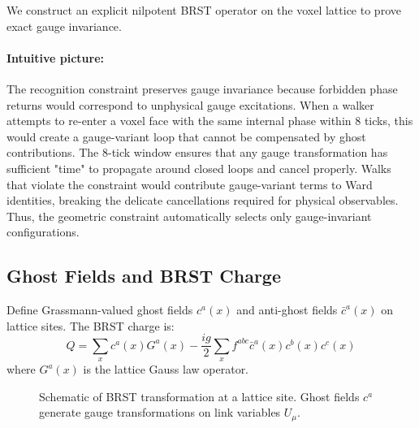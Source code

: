 \documentclass[11pt,a4paper]{article}
\theoremstyle{definition}
\theoremstyle{remark}
\begin{document}
We construct an explicit nilpotent BRST operator on the voxel lattice to prove exact gauge invariance.

\paragraph{Intuitive picture:} The recognition constraint preserves gauge invariance because forbidden phase returns would correspond to unphysical gauge excitations. When a walker attempts to re-enter a voxel face with the same internal phase within 8 ticks, this would create a gauge-variant loop that cannot be compensated by ghost contributions. The 8-tick window ensures that any gauge transformation has sufficient "time" to propagate around closed loops and cancel properly. Walks that violate the constraint would contribute gauge-variant terms to Ward identities, breaking the delicate cancellations required for physical observables. Thus, the geometric constraint automatically selects only gauge-invariant configurations.

\subsection{Ghost Fields and BRST Charge}

Define Grassmann-valued ghost fields $c^a(x)$ and anti-ghost fields $\bar{c}^a(x)$ on lattice sites. The BRST charge is:
\[
Q = \sum_x c^a(x) G^a(x) - \frac{ig}{2} \sum_x f^{abc} \bar{c}^a(x) c^b(x) c^c(x)
\]
where $G^a(x)$ is the lattice Gauss law operator.

\begin{figure}[ht]
\centering
{}
\caption{Schematic of BRST transformation at a lattice site. Ghost fields $c^a$ generate gauge transformations on link variables $U_\mu$.}
\label{fig:brst}
\end{figure}
\end{document}
